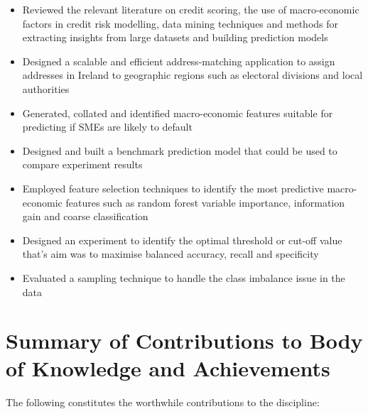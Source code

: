 \begin{itemize}
	\item Reviewed the relevant literature on credit scoring, the use of macro-economic factors in credit risk modelling, data mining techniques and methods for extracting insights from large datasets and building prediction models
	\item Designed a scalable and efficient address-matching application to assign addresses in Ireland to geographic regions such as electoral divisions and local authorities
	\item Generated, collated and identified macro-economic features suitable for predicting if SMEs are likely to default
	\item Designed and built a benchmark prediction model that could be used to compare experiment results
	\item Employed feature selection techniques to identify the most predictive macro-economic features such as random forest variable importance, information gain and coarse classification
	\item Designed an experiment to identify the optimal threshold or cut-off value that's aim was to maximise balanced accuracy, recall and specificity 
	\item Evaluated a sampling technique to handle the class imbalance issue in the data
\end{itemize}





\section{Summary of Contributions to Body of Knowledge and Achievements}

The following constitutes the worthwhile contributions to the discipline:

